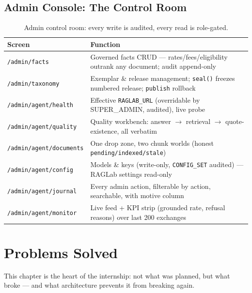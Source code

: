 \documentclass[a4paper,12pt]{report}
\begin{document}
\section{Admin Console: The Control Room}

\begin{table}[H]
\centering\footnotesize
\begin{tabular}{p{4.0cm}p{10.5cm}}
\toprule
\textbf{Screen} & \textbf{Function} \\
\midrule
\texttt{/admin/facts} & Governed facts CRUD --- rates/fees/eligibility outrank any document; audit append-only \\
\texttt{/admin/taxonomy} & Exemplar \& release management; \texttt{seal()} freezes numbered release; \texttt{publish} rollback \\
\texttt{/admin/agent/health} & Effective \texttt{RAGLAB\_URL} (overridable by SUPER\_ADMIN, audited), live probe \\
\texttt{/admin/agent/quality} & Quality workbench: answer $\rightarrow$ retrieval $\rightarrow$ quote-existence, all verbatim \\
\texttt{/admin/agent/documents} & One drop zone, two chunk worlds (honest \texttt{pending/indexed/stale}) \\
\texttt{/admin/agent/config} & Models \& keys (write-only, \texttt{CONFIG\_SET} audited) --- RAGLab settings read-only \\
\texttt{/admin/agent/journal} & Every admin action, filterable by action, searchable, with motive column \\
\texttt{/admin/agent/monitor} & Live feed + KPI strip (grounded rate, refusal reasons) over last 200 exchanges \\
\bottomrule
\end{tabular}
\caption{Admin control room: every write is audited, every read is role-gated.}
\end{table}

\chapter{Problems Solved}\label{sec:problems}

This chapter is the heart of the internship: not what was planned, but what broke --- and what architecture prevents it from breaking again.
\end{document}
